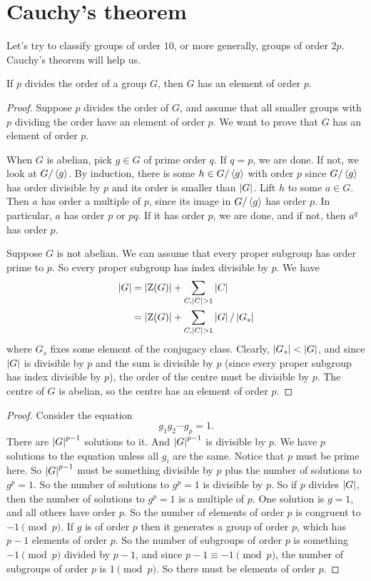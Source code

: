 \documentclass[11pt, twoside]{amsart}
\begin{document}
\section{Cauchy's theorem}
Let's try to classify groups of order $10$, or more generally, groups of order $2p$. Cauchy's theorem will help us.
\begin{theorem}[Cauchy]\label{cauchy}
If $p$ divides the order of a group $G$, then $G$ has an element of order $p$.
\end{theorem}
\begin{proof}
Suppose $p$ divides the order of $G$, and assume that all smaller groups with $p$ dividing the order have an element of order $p$. We want to prove that $G$ has an element of order $p$.

When $G$ is abelian, pick $g\in G$ of prime order $q$. If $q=p$, we are done. If not, we look at $G/\left \langle g \right \rangle$. By induction, there is some $h\in G/\left \langle g \right \rangle$ with order $p$ since $G/\left \langle g \right \rangle$ has order divisible by $p$ and its order is smaller than $\left \lvert G \right \rvert$. Lift $h$ to some $a\in G$. Then $a$ has order a multiple of $p$, since its image in $G/\left \langle g \right \rangle$ has order $p$. In particular, $a$ has order $p$ or $pq$. If it has order $p$, we are done, and if not, then $a^q$ has order $p$.

Suppose $G$ is not abelian. We can assume that every proper subgroup has order prime to $p$. So every proper subgroup has index divisible by $p$. We have
\begin{align*}
\left \lvert G \right \rvert &= \left \lvert \operatorname{Z}(G) \right \rvert + \sum_{C,\left \lvert C \right \rvert > 1}\left \lvert C \right \rvert\\
&= \left \lvert \operatorname{Z}(G) \right \rvert + \sum_{C,\left \lvert C \right \rvert > 1} \left \lvert G \right \rvert/\left \lvert G_s \right \rvert
\end{align*}
where $G_s$ fixes some element of the conjugacy class. Clearly, $\left \lvert G_s \right \rvert < \left \lvert G \right \rvert$, and since $\left \lvert G \right \rvert $ is divisible by $p$ and the sum is divisible by $p$ (since every proper subgroup has index divisible by $p$), the order of the centre must be divisible by $p$. The centre of $G$ is abelian, so the centre has an element of order $p$.
\end{proof}

\begin{proof}
Consider the equation
$$
g_1g_2\cdots g_p = 1.
$$
There are $\left \lvert G \right \rvert ^{p-1}$ solutions to it. And $\left \lvert G \right \rvert^{p-1}$ is divisible by $p$. We have $p$ solutions to the equation unless all $g_i$ are the same. Notice that $p$ must be prime here. So $\left \lvert G \right \rvert^{p-1}$ must be something divisible by $p$ plus the number of solutions to $g^p=1$. So the number of solutions to $g^p=1$ is divisible by $p$. So if $p$ divides $\left \lvert G \right \rvert$, then the number of solutions to $g^p=1$ is a multiple of $p$. One solution is $g=1$, and all others have order $p$. So the number of elements of order $p$ is congruent to $-1\pmod p$. If $g$ is of order $p$ then it generates a group of order $p$, which has $p-1$ elements of order $p$. So the number of subgroups of order $p$ is something $-1\pmod p$ divided by $p-1$, and since $p-1\equiv -1\pmod p$, the number of subgroups of order $p$ is $1\pmod p$. So there must be elements of order $p$.
\end{proof}
\end{document}

